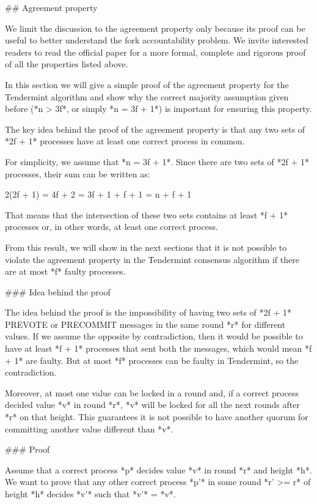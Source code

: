 \documentclass[a4paper,11pt,oneside]{report}
\begin{document}
\begin{markdown}
## Agreement property

We limit the discussion to the agreement property only because its proof can be useful to better understand the fork accountability problem. 
We invite interested readers to read the official paper for a more formal, complete and rigorous proof of all the properties listed above.

In this section we will give a simple proof of the agreement property for the Tendermint algorithm and show why the correct majority assumption given before (*n > 3f*, or simply *n = 3f + 1*) is important for ensuring this property.

The key idea behind the proof of the agreement property is that any two sets of *2f + 1* processes have at least one correct process in common.

For simplicity, we assume that *n = 3f + 1*.
Since there are two sets of *2f + 1* processes, their sum can be written as:
 
    2(2f + 1) = 4f + 2 = 3f + 1 + f + 1 = n + f + 1
     
That means that the intersection of these two sets contains at least *f + 1* processes or, in other words, at least one correct process.  

From this result, we will show in the next sections that it is not possible to violate the agreement property in the Tendermint consensus algorithm if there are at most *f* faulty processes.

### Idea behind the proof

The idea behind the proof is the impossibility of having two sets of *2f + 1* PREVOTE or PRECOMMIT messages in the same round *r* for different values. If we assume the opposite by contradiction, then it would be possible to have at least *f + 1* processes that sent both the messages, which would mean *f + 1* are faulty. But at most *f* processes can be faulty in Tendermint, so the contradiction.

Moreover, at most one value can be locked in a round and, if a correct process decided value *v* in round *r*, *v* will be locked for all the next rounds after *r* on that height. This guarantees it is not possible to have another quorum for committing another value different than *v*.

### Proof

Assume that a correct process *p* decides value *v* in round *r* and height *h*. We want to prove that any other correct process *p'* in some round *r' >= r* of height *h* decides *v'* such that *v'* = *v*.


\end{markdown}
\end{document}

